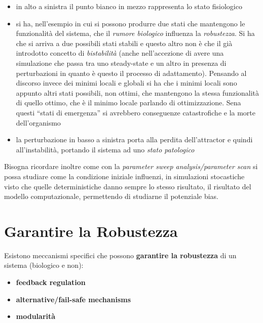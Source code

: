 \documentclass[a4paper,12pt, oneside]{book}
\begin{document}
\begin{itemize}
  \item in alto a sinistra il punto bianco in mezzo rappresenta lo stato
  fisiologico
  \item si ha, nell'esempio in cui si possono produrre due stati che mantengono
  le funzionalità del sistema, che il
  \textit{rumore biologico} influenza la \textit{robustezza}. Si ha che si
  arriva a due possibili stati stabili e questo altro non è che il già
  introdotto concetto di \textit{bistabilità} (anche nell'accezione di avere una
  simulazione che passa tra uno steady-state e un altro in presenza di
  perturbazioni in quanto è questo il processo di adattamento). Pensando al
  discorso invece dei minimi locali e globali si ha che i minimi locali sono
  appunto altri stati possibili, non ottimi, che mantengono la stessa
  funzionalità di quello ottimo, che è il minimo locale parlando di
  ottimizzazione. Sena questi ``stati di emergenza'' si avrebbero conseguenze
  catastrofiche e la morte dell'organismo
  \item la perturbazione in  basso a sinistra porta alla perdita dell'attractor
  e quindi all'instabilità, portando il sistema ad uno \textit{stato patologico}
\end{itemize}
Bisogna ricordare inoltre come con la \textit{parameter sweep analysis/parameter
scan} si possa 
studiare come la condizione iniziale influenzi, in simulazioni stocastiche visto
che quelle deterministiche danno sempre lo stesso risultato, il risultato del
modello computazionale, permettendo di studiarne il potenziale bias.
\section{Garantire la Robustezza}
Esistono meccanismi specifici che possono \textbf{garantire la robustezza} di un
sistema (biologico e non):
\begin{itemize}
  \item \textbf{feedback regulation}
  \item \textbf{alternative/fail-safe mechanisms}
  \item \textbf{modularità}
\end{itemize}
\end{document}
